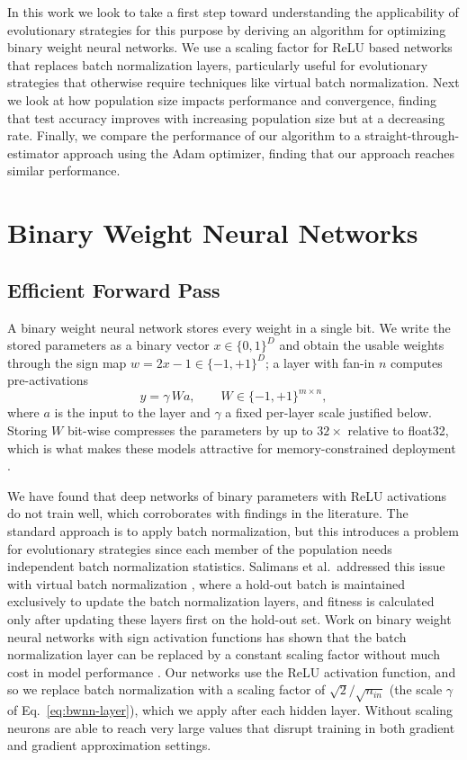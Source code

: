 \documentclass[runningheads]{llncs}
\begin{document}
In this work we look to take a first step toward understanding the applicability of evolutionary strategies for this purpose by deriving an algorithm for optimizing binary weight neural networks. We use a scaling factor for ReLU based networks that replaces batch normalization layers, particularly useful for evolutionary strategies that otherwise require techniques like virtual batch normalization. Next we look at how population size impacts performance and convergence, finding that test accuracy improves with increasing population size but at a decreasing rate. Finally, we compare the performance of our algorithm to a straight-through-estimator approach using the Adam optimizer, finding that our approach reaches similar performance.

\section{Binary Weight Neural Networks}
\label{sec:BWNN}

\subsection{Efficient Forward Pass}
\label{sec:bwnn:forward}

A binary weight neural network stores every weight in a single bit. We
write the stored parameters as a binary vector $x \in \{0,1\}^{D}$ and
obtain the usable weights through the sign map $w = 2x - 1 \in
\{-1,+1\}^{D}$; a layer with fan-in $n$ computes pre-activations
\begin{equation}
y = \gamma\, W a,
\qquad W \in \{-1,+1\}^{m \times n},
\label{eq:bwnn-layer}
\end{equation}
where $a$ is the input to the layer and $\gamma$ a fixed per-layer scale
justified below. Storing $W$ bit-wise compresses the
parameters by up to $32\times$ relative to float32, which is what makes
these models attractive for memory-constrained deployment
\cite{courbariaux2016binarized,rastegari2016xnor,yuan2023survey}.

We have found that deep networks of binary parameters with ReLU
activations do not train well, which corroborates with findings in the
literature. The standard approach is to apply batch normalization, but
this introduces a problem for evolutionary strategies since each member
of the population needs independent batch normalization statistics.
Salimans et al.\ addressed this issue with virtual batch normalization
\cite{salimans2017evolution}, where a hold-out batch is maintained
exclusively to update the batch normalization layers, and fitness is
calculated only after updating these layers first on the hold-out set.
Work on binary weight neural networks with sign activation functions has
shown that the batch normalization layer can be replaced by a constant
scaling factor without much cost in model performance
\cite{sari2019batchnorm}. Our networks use the ReLU activation function,
and so we replace batch normalization with a scaling factor of
$\sqrt{2}/\sqrt{n_{in}}$ (the scale $\gamma$ of
Eq.~\ref{eq:bwnn-layer}), which we apply after each hidden layer. Without scaling neurons are able to reach very large values that disrupt training in both gradient and gradient approximation settings.
\end{document}
